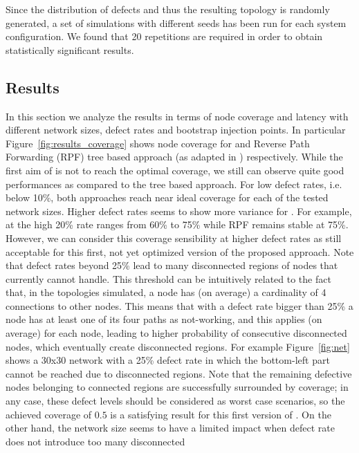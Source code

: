 Since the distribution of defects and thus the resulting topology is randomly
generated, a set of simulations with different seeds has been run
for each system configuration. We found that 20 repetitions are
required in order to obtain statistically significant results.


\subsection{Results}
\label{sec:results}

In this section we analyze the results in terms of node coverage and
latency with different network sizes, defect rates and bootstrap
injection points. In particular Figure~\ref{fig:results_coverage}
shows node coverage for \disr{} and Reverse Path Forwarding (RPF) tree
based approach (as adapted in \cite{patwardhan_nanoarch06}) respectively. 
While the first aim of \disr{} is not to
reach the optimal coverage, we still can observe quite good
performances as compared to the tree based approach. For low defect
rates, i.e. below 10\%, both approaches reach near ideal coverage for
each of the tested network sizes. Higher defect rates seems to show
more variance for \disr{}. For example, at the high 20\% rate \disr{}
ranges from 60\% to 75\% while RPF remains stable at 75\%. However, we
can consider this coverage sensibility at higher defect rates as still acceptable
for this first, not yet optimized version of the proposed approach.
Note that defect rates beyond 25\% lead to many disconnected
regions of nodes that \disr{} currently cannot handle. This threshold can be
intuitively related to the fact that, in the topologies simulated, a
node has (on average) a cardinality of 4 connections to other nodes. This means
that with a defect rate bigger than 25\% a node has at least one of its four
paths as not-working, and this applies (on average) for each node,
leading to higher probability of consecutive disconnected
nodes, which eventually create disconnected regions. For example Figure~\ref{fig:net} shows a 30x30 network with a 25\%
defect rate in which the bottom-left part cannot be reached due to
disconnected regions. Note that the remaining defective nodes belonging to
connected regions are successfully surrounded by \disr{} coverage; in any
case, these defect levels should be considered as worst case scenarios, so the
achieved coverage of $0.5$ is a satisfying result for this first
version of \disr{}. On the other hand, the network size seems to have a
limited impact when defect rate does not introduce too many disconnected
